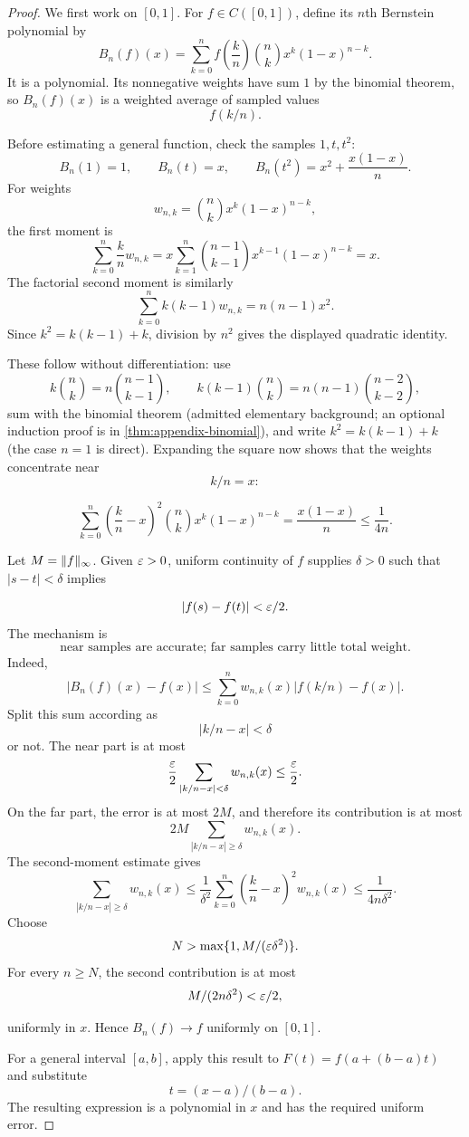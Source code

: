 \begin{proof}
We first work on $[0,1]$.  For $f\in C([0,1])$, define its $n$th Bernstein
polynomial by
\[
B_n(f)(x)=\sum_{k=0}^nf\left(\frac kn\right)\binom nkx^k(1-x)^{n-k}.
\]
It is a polynomial.  Its nonnegative weights have sum $1$ by the binomial
theorem, so $B_n(f)(x)$ is a weighted average of sampled values
\[
f(k/n).
\]

Before estimating a general function, check the samples $1,t,t^2$:
\[
B_n(1)=1,\qquad B_n(t)=x,\qquad B_n(t^2)=x^2+\frac{x(1-x)}n.
\]
For weights
\[
w_{n,k}=\binom nkx^k(1-x)^{n-k},
\]
 the first moment is
\[
\sum_{k=0}^n\frac{k}{n}w_{n,k}
=x\sum_{k=1}^n\binom{n-1}{k-1}x^{k-1}(1-x)^{n-k}=x.
\]
The factorial second moment is similarly
\[
\sum_{k=0}^n k(k-1)w_{n,k}=n(n-1)x^2.
\]
Since $k^2=k(k-1)+k$,
division by $n^2$ gives the displayed quadratic identity.

These follow without differentiation: use
\[
k\binom nk=n\binom{n-1}{k-1},
\qquad
k(k-1)\binom nk=n(n-1)\binom{n-2}{k-2},
\]
sum with the binomial theorem
(admitted elementary background; an optional induction proof is in
\cref{thm:appendix-binomial}),
and write $k^2=k(k-1)+k$ (the case $n=1$ is direct).
Expanding the square now shows that the weights concentrate near
\[
k/n=x:
\]

\[
\sum_{k=0}^n\left(\frac{k}{n}-x\right)^2
\binom nkx^k(1-x)^{n-k}=\frac{x(1-x)}n\leq\frac1{4n}.
\]

Let $M=\lVert f\rVert_\infty$.  Given $\varepsilon>0$, uniform continuity of $f$ supplies
$\delta>0$ such that $|s-t|<\delta$ implies

\[
|f(s)-f(t)|<\varepsilon/2.
\]
The mechanism is
\[
\boxed{\text{near samples are accurate; far samples carry little total weight}.}
\]
Indeed,
\[
|B_n(f)(x)-f(x)|
\leq\sum_{k=0}^nw_{n,k}(x)\left|f(k/n)-f(x)\right|.
\]
Split this sum according as
\[
|k/n-x|<\delta
\]
or not. The near part is at most
\[
\frac{\varepsilon}2\sum_{|k/n-x|<\delta}w_{n,k}(x)
\leq\frac{\varepsilon}2.
\]
On the far part, the error is at most $2M$, and therefore its contribution
is at most
\[
2M\sum_{|k/n-x|\geq\delta}w_{n,k}(x).
\]
The second-moment estimate gives
\[
\sum_{|k/n-x|\geq\delta}w_{n,k}(x)
\leq\frac1{\delta^2}\sum_{k=0}^n\left(\frac{k}{n}-x\right)^2
 w_{n,k}(x)
\leq\frac1{4n\delta^2}.
\]
Choose
\[
N>\max\{1,M/(\varepsilon\delta^2)\}.
\]
 For every $n\geq N$,
the second contribution is at most
\[
M/(2n\delta^2)<\varepsilon/2,
\]

uniformly in $x$.  Hence $B_n(f)\to f$ uniformly on $[0,1]$.

For a general interval $[a,b]$, apply this result to
$F(t)=f(a+(b-a)t)$ and substitute
\[
t=(x-a)/(b-a).
\]
  The resulting expression
is a polynomial in $x$ and has the required uniform error.
\end{proof}

